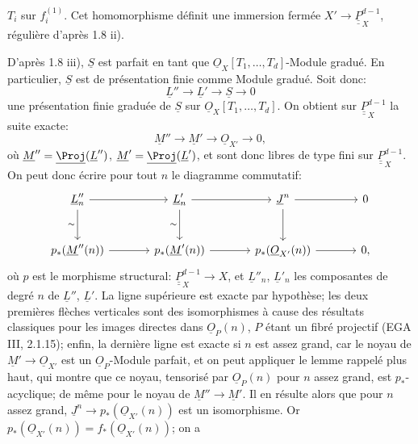 
\(T_i\) sur \(f_i^{(1)}\). Cet
homomorphisme définit une immersion fermée \(X'\longrightarrow\underline{\underline{P}}_X^{d-1}\), régulière d'après 1.8 ii).

D'après 1.8 iii), \(\underline{S}\) est parfait en tant que \(\underline{O}_X[T_1,\ldots,T_d]\)-Module gradué. En particulier, \(\underline{S}\) est de présentation finie comme Module gradué. Soit donc:
\[
\underline{L}''\longrightarrow \underline{L}'\longrightarrow \underline{S}\longrightarrow0
\]
une présentation finie graduée de \(\underline{S}\) sur \(\underline{O}_X[T_1,\ldots,T_d]\). On obtient sur \(\underline{\underline{P}}_X^{d-1}\) la suite exacte:
\[
\underline{M}''\longrightarrow \underline{M}'\longrightarrow\underline{O}_{X'}\longrightarrow0,
\]
où \(\underline{M}''=\underline{\Proj}(\underline{L}'')\), \(\underline{M}'=\underline{\Proj}(\underline{L}')\), et sont donc libres de type fini sur \(\underline{\underline{P}}_X^{d-1}\). On peut donc écrire pour tout \(n\) le diagramme commutatif:
\[
\begin{tikzcd}[column sep=large,row sep=large]
\underline{L}''_n \arrow[r] \arrow[d,"\sim"'] &
\underline{L}'_n \arrow[r] \arrow[d,"\sim"'] &
\underline{J}^n \arrow[r] \arrow[d] &
0\\
p_*(\underline{M}''(n)) \arrow[r] &
p_*(\underline{M}'(n)) \arrow[r] &
p_*(\underline{O}_{X'}(n)) \arrow[r] &
0,
\end{tikzcd}
\]
où \(p\) est le morphisme structural: \(\underline{\underline{P}}_X^{d-1}\to X\), et \(\underline{L}''_n\), \(\underline{L}'_n\) les composantes de degré \(n\) de \(\underline{L}''\), \(\underline{L}'\). La ligne supérieure est exacte par hypothèse; les deux premières flèches verticales sont des isomorphismes à cause des résultats classiques pour les images directes dans \(\underline{O}_P(n)\), \(P\) étant un fibré projectif (EGA III, 2.1.15); enfin, la dernière ligne est exacte si \(n\) est assez grand, car le noyau de \(\underline{M}'\to\underline{O}_{X'}\) est un \(\underline{O}_P\)-Module parfait, et on peut appliquer le lemme rappelé plus haut, qui montre que ce noyau, tensorisé par \(\underline{O}_P(n)\) pour \(n\) assez grand, est \(p_*\)-acyclique; de même pour le noyau de \(\underline{M}''\to \underline{M}'\). Il en résulte alors que pour \(n\) assez grand, \(\underline{J}^n\longrightarrow p_*(\underline{O}_{X'}(n))\) est un isomorphisme. Or \(p_*(\underline{O}_{X'}(n))=f_*(\underline{O}_{X'}(n))\); on a
